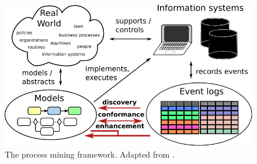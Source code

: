 %	
%	
%	
%	


\begin{figure}
	\centering
	\includegraphics[width=0.9\linewidth]{figures/process-mining-big-picture}
	\caption[The process mining framework]{The process mining framework. Adapted from \citep{DBLP:books/sp/Aalst16}.}
	\label{fig:process-mining}
\end{figure}



